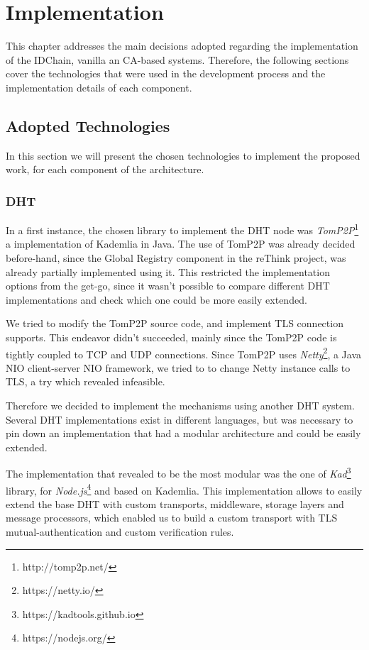 \chapter{Implementation}
\label{chapter:implementation}

This chapter addresses the main decisions adopted regarding the implementation of the IDChain, vanilla an CA-based systems. Therefore, the following sections cover the technologies that were used in the development process and the implementation details of each component.

\section{Adopted Technologies}

In this section we will present the chosen technologies to implement the proposed work, for each component of the architecture.

\subsection{DHT}

In a first instance, the chosen library to implement the DHT node was \textit{TomP2P}\footnote{http://tomp2p.net/} a implementation of Kademlia in Java.
The use of TomP2P was already decided before-hand, since the Global Registry component in the reThink project, was already partially implemented using it.
This restricted the implementation options from the get-go, since it wasn't possible to compare different \ac{DHT} implementations and check which one could be more easily extended.

We tried to modify the TomP2P source code, and implement TLS connection supports.
This endeavor didn't succeeded, mainly since the TomP2P code is tightly coupled to TCP and UDP connections.
Since TomP2P uses \textit{Netty}\footnote{https://netty.io/}, a Java NIO client-server \ac{NIO} framework, we tried to to change Netty instance calls to TLS, a try which revealed infeasible.

Therefore we decided to implement the mechanisms using another DHT system.
Several DHT implementations exist in different languages, but was necessary to pin down an implementation that had a modular architecture and could be easily extended.

The implementation that revealed to be the most modular was the one of \textit{Kad}\footnote{https://kadtools.github.io} library, for \textit{Node.js}\footnote{https://nodejs.org/} and based on Kademlia.
This implementation allows to easily extend the base DHT with custom transports, middleware, storage layers and message processors, which enabled us to build a custom transport with TLS mutual-authentication and custom verification rules.

